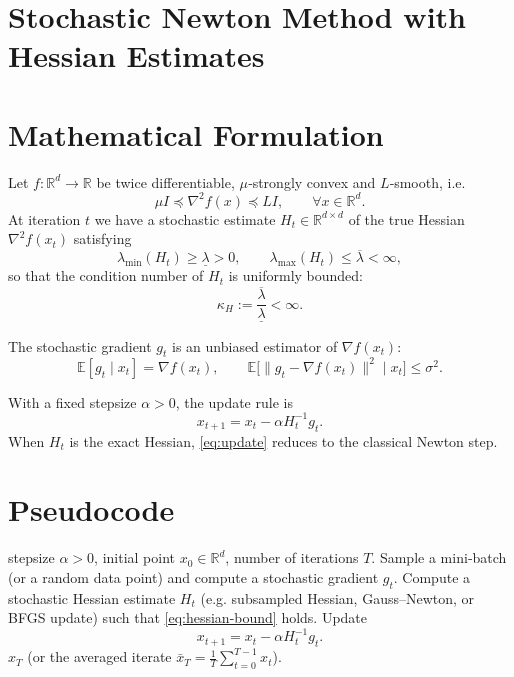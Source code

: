 \documentclass{article}
\newcommand{\E}{\mathbb{E}}
\newcommand{\R}{\mathbb{R}}
\begin{document}
\section*{Stochastic Newton Method with Hessian Estimates}

\section*{Mathematical Formulation}
Let $f:\R^{d}\to\R$ be twice differentiable, $\mu$‑strongly convex and $L$‑smooth, i.e.
\[
\mu I \preceq \nabla^{2}f(x) \preceq L I,\qquad\forall x\in\R^{d}.
\]
At iteration $t$ we have a stochastic estimate $H_{t}\in\R^{d\times d}$ of the true Hessian $\nabla^{2}f(x_{t})$ satisfying  
\begin{equation}
\label{eq:hessian-bound}
\lambda_{\min}(H_{t})\ge \underline{\lambda}>0,\qquad 
\lambda_{\max}(H_{t})\le \overline{\lambda}<\infty,
\end{equation}
so that the condition number of $H_{t}$ is uniformly bounded:
\[
\kappa_{H}:=\frac{\overline{\lambda}}{\underline{\lambda}}<\infty .
\]

The stochastic gradient $g_{t}$ is an unbiased estimator of $\nabla f(x_{t})$:
\[
\E[g_{t}\mid x_{t}]=\nabla f(x_{t}),\qquad 
\E\big[\|g_{t}-\nabla f(x_{t})\|^{2}\mid x_{t}\big]\le\sigma^{2}.
\]

With a fixed stepsize $\alpha>0$, the update rule is
\begin{equation}
\label{eq:update}
x_{t+1}=x_{t}-\alpha H_{t}^{-1} g_{t}.
\end{equation}
When $H_{t}$ is the exact Hessian, \eqref{eq:update} reduces to the classical Newton step.

\section*{Pseudocode}
\begin{algorithm}[H]
\caption{Stochastic Newton with Bounded Hessian Estimates}
\begin{algorithmic}[1]
 stepsize $\alpha>0$, initial point $x_{0}\in\R^{d}$, 
        number of iterations $T$.
    \STATE Sample a mini‑batch (or a random data point) and compute a stochastic gradient $g_{t}$.
    \STATE Compute a stochastic Hessian estimate $H_{t}$ (e.g. subsampled Hessian, Gauss–Newton, or BFGS update) such that \eqref{eq:hessian-bound} holds.
    \STATE Update 
    \[
    x_{t+1}=x_{t}-\alpha H_{t}^{-1}g_{t}.
    \]
\ENDFOR
{} $x_{T}$ (or the averaged iterate $\bar x_{T}=\tfrac1T\sum_{t=0}^{T-1}x_{t}$).
\end{algorithmic}
\end{algorithm}
\end{document}
